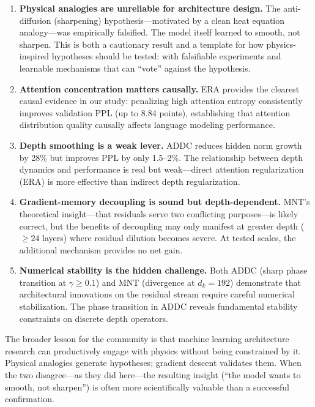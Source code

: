 \documentclass[10pt]{article}
\begin{document}
\begin{enumerate}[leftmargin=*,itemsep=2pt]
    \item \textbf{Physical analogies are unreliable for architecture design.} The anti-diffusion (sharpening) hypothesis---motivated by a clean heat equation analogy---was empirically falsified. The model itself learned to smooth, not sharpen. This is both a cautionary result and a template for how physics-inspired hypotheses should be tested: with falsifiable experiments and learnable mechanisms that can ``vote'' against the hypothesis.
    
    \item \textbf{Attention concentration matters causally.} ERA provides the clearest causal evidence in our study: penalizing high attention entropy consistently improves validation PPL (up to 8.84 points), establishing that attention distribution quality causally affects language modeling performance.
    
    \item \textbf{Depth smoothing is a weak lever.} ADDC reduces hidden norm growth by 28\% but improves PPL by only 1.5--2\%. The relationship between depth dynamics and performance is real but weak---direct attention regularization (ERA) is more effective than indirect depth regularization.
    
    \item \textbf{Gradient-memory decoupling is sound but depth-dependent.} MNT's theoretical insight---that residuals serve two conflicting purposes---is likely correct, but the benefits of decoupling may only manifest at greater depth ($\geq 24$ layers) where residual dilution becomes severe. At tested scales, the additional mechanism provides no net gain.
    
    \item \textbf{Numerical stability is the hidden challenge.} Both ADDC (sharp phase transition at $\gamma \geq 0.1$) and MNT (divergence at $d_k=192$) demonstrate that architectural innovations on the residual stream require careful numerical stabilization. The phase transition in ADDC reveals fundamental stability constraints on discrete depth operators.
\end{enumerate}

The broader lesson for the community is that machine learning architecture research can productively engage with physics without being constrained by it. Physical analogies generate hypotheses; gradient descent validates them. When the two disagree---as they did here---the resulting insight (``the model wants to smooth, not sharpen'') is often more scientifically valuable than a successful confirmation.
\end{document}
